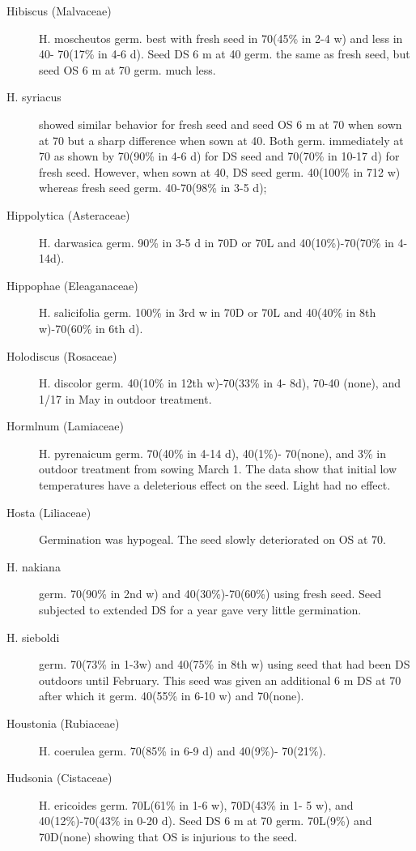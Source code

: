 \begin{description}
\item[Hibiscus (Malvaceae)]
H. moscheutos germ. best with fresh seed in 70(45\% in 2-4 w) and less in 40-
70(17\% in 4-6 d). Seed DS 6 m at 40 germ. the same as fresh seed, but seed OS 6 m
at 70 germ. much less.

\item[H. syriacus] showed similar behavior for fresh seed and seed OS 6 m at 70
when sown at 70 but a sharp difference when sown at 40. Both germ. immediately at
70 as shown by 70(90\% in 4-6 d) for DS seed and 70(70\% in 10-17 d) for fresh seed.
However, when sown at 40, DS seed germ. 40(100\% in 712 w) whereas fresh seed
germ. 40-70(98\% in 3-5 d);

\item[Hippolytica (Asteraceae)] H. darwasica germ. 90\% in 3-5 d in 70D or 70L
and 40(10\%)-70(70\% in 4-14d).
\item[Hippophae (Eleaganaceae)] H. salicifolia germ. 100\% in 3rd w in 70D or
70L and 40(40\% in 8th w)-70(60\% in 6th d).

\item[Holodiscus (Rosaceae)] H. discolor germ. 40(10\% in 12th w)-70(33\% in 4-
8d), 70-40 (none), and 1/17 in May in outdoor treatment.

\item[Hormlnum (Lamiaceae)] H. pyrenaicum germ. 70(40\% in 4-14 d), 40(1\%)-
70(none), and 3\% in outdoor treatment from sowing March 1. The data show that
initial low temperatures have a deleterious effect on the seed. Light had no effect.

\item[Hosta (Liliaceae)] Germination was hypogeal. The seed slowly deteriorated
on OS at 70.
\item[H. nakiana] germ. 70(90\% in 2nd w) and 40(30\%)-70(60\%) using fresh seed.
Seed subjected to extended DS for a year gave very little germination.
\item[H. sieboldi] germ. 70(73\% in 1-3w) and 40(75\% in 8th w) using seed that had
been DS outdoors until February. This seed was given an additional 6 m DS at 70
after which it germ. 40(55\% in 6-10 w) and 70(none).

\item[Houstonia (Rubiaceae)] H. coerulea germ. 70(85\% in 6-9 d) and 40(9\%)-
70(21\%).
\item[Hudsonia (Cistaceae)] H. ericoides germ. 70L(61\% in 1-6 w), 70D(43\% in 1-
5 w), and 40(12\%)-70(43\% in 0-20 d). Seed DS 6 m at 70 germ. 70L(9\%) and
70D(none) showing that OS is injurious to the seed.


\end{description}
